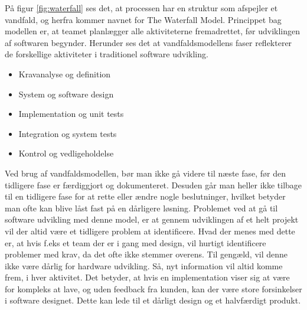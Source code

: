 På figur \ref{fig:waterfall} ses det, at processen har en struktur som afspejler et vandfald, og herfra kommer navnet for The Waterfall Model. Princippet bag modellen er, at teamet planlægger alle aktiviteterne fremadrettet, før udviklingen af softwaren begynder. Herunder ses det at vandfaldsmodellens faser reflekterer de forskellige aktiviteter i traditionel software udvikling.\cite{Sommerville} 
\begin{itemize}
    \item Kravanalyse og definition
    \item System og software design
    \item Implementation og unit tests
    \item Integration og system tests
    \item Kontrol og vedligeholdelse 
\end{itemize}

Ved brug af vandfaldsmodellen, bør man ikke gå videre til næste fase, før den tidligere fase er færdiggjort og dokumenteret. Desuden går man heller ikke tilbage til en tidligere fase for at rette eller ændre nogle beslutninger, hvilket betyder man ofte kan blive låst fast på en dårligere løsning. Problemet ved at gå til software udvikling med denne model, er at gennem udviklingen af et helt projekt vil der altid være et tidligere problem at identificere. Hvad der menes med dette er, at hvis f.eks et team der er i gang med design, vil hurtigt identificere problemer med krav, da det ofte ikke stemmer overens. Til gengæld, vil denne ikke være dårlig for hardware udvikling. Så, nyt information vil altid komme frem, i hver aktivitet. Det betyder, at hvis en implementation viser sig at være for kompleks at lave, og uden feedback fra kunden, kan der være store forsinkelser i software designet. Dette kan lede til et dårligt design og et halvfærdigt produkt.\cite{Sommerville} 

